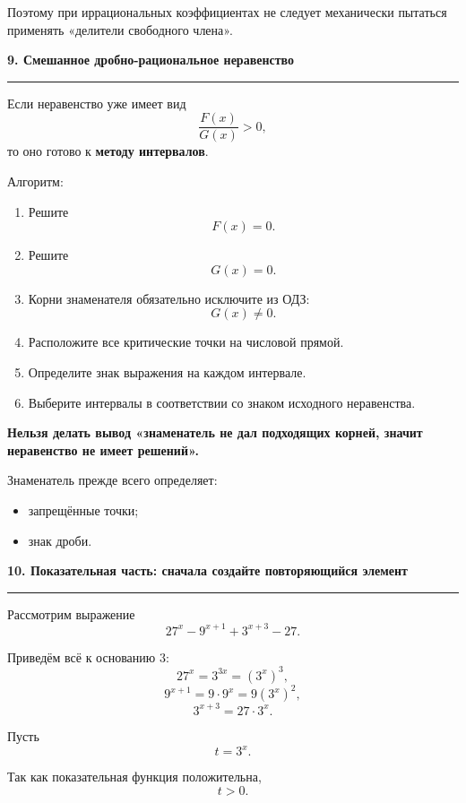 \documentclass[a4paper,12pt]{article}
\newcommand{\checktitle}[1]{%
    \vspace{0.4em}
    {\Large\bfseries\textcolor{darkaccent}{#1}}\par
    \vspace{0.25em}
    {\color{accent!55}\rule{\linewidth}{0.6pt}}
    \vspace{0.45em}
}
\newcommand{\important}[1]{\textbf{\textcolor{darkaccent}{#1}}}
\begin{document}
Поэтому при иррациональных коэффициентах не следует механически пытаться применять «делители свободного члена».


\checktitle{9. Смешанное дробно-рациональное неравенство}

Если неравенство уже имеет вид
\[
    \frac{F(x)}{G(x)}>0,
\]
то оно готово к \important{методу интервалов}.

Алгоритм:

\begin{enumerate}
    \item Решите
    \[
        F(x)=0.
    \]

    \item Решите
    \[
        G(x)=0.
    \]

    \item Корни знаменателя обязательно исключите из ОДЗ:
    \[
        G(x)\ne0.
    \]

    \item Расположите все критические точки на числовой прямой.

    \item Определите знак выражения на каждом интервале.

    \item Выберите интервалы в соответствии со знаком исходного неравенства.
\end{enumerate}

\important{Нельзя делать вывод «знаменатель не дал подходящих корней, значит неравенство не имеет решений».}

Знаменатель прежде всего определяет:
\begin{itemize}
    \item запрещённые точки;
    \item знак дроби.
\end{itemize}


\checktitle{10. Показательная часть: сначала создайте повторяющийся элемент}

Рассмотрим выражение
\[
    27^x-9^{x+1}+3^{x+3}-27.
\]

Приведём всё к основанию \(3\):
\[
    27^x=3^{3x}=(3^x)^3,
\]
\[
    9^{x+1}
    =
    9\cdot9^x
    =
    9(3^x)^2,
\]
\[
    3^{x+3}=27\cdot3^x.
\]

Пусть
\[
    t=3^x.
\]

Так как показательная функция положительна,
\[
    \boxed{t>0}.
\]
\end{document}
